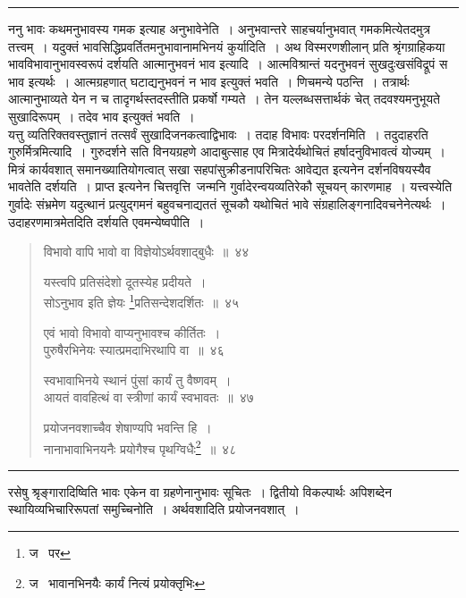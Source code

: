 \documentclass[11pt, openany]{book}
\begin{document}
\hrule

\vspace{2mm}
ननु भावः कथमनुभावस्य गमक इत्याह अनुभावेनेति~। अनुभवान्तरे साहचर्यानुभवात् गमकमित्येतदमुत्र तत्त्वम्~। यदुक्तं भावसिद्धिप्रवर्तितमनुभावानामभिनयं कुर्यादिति~। अथ विस्मरणशीलान् प्रति श्रृंगग्राहिकया भावविभावानुभावस्वरूपं दर्शयति आत्मानुभवनं भाव इत्यादि~। आत्मविश्रान्तं यदनुभवनं सुखदुःखसंविद्रूपं स भाव इत्यर्थः~। आत्मग्रहणात् घटाद्यनुभवनं न भाव इत्युक्तं भवति~। णिचमन्ये पठन्ति~। तत्रार्थः आत्मानुभाव्यते येन न च तादृगर्थस्तदस्तीति प्रकर्षो गम्यते~। तेन यल्लब्धसत्तार्थकं चेत् तदवश्यमनुभूयते सुखादिरूपम्~। तदेव भाव इत्युक्तं भवति~।\\

यत्तु व्यतिरिक्तवस्तुज्ञानं तत्सर्वं सुखादिजनकत्वाद्विभावः~। तदाह विभावः परदर्शनमिति~। तदुदाहरति गुरुर्मित्रमित्यादि~। गुरुदर्शने सति विनयग्रहणे आदाबुत्साह एव मित्रादेर्यथोचितं हर्षादनुविभावत्वं योज्यम्~। मित्रं कार्यवशात् समानख्यातियोगत्वात् सखा सहपांसुक्रीडनापरिचितः आवेद्यत इत्यनेन दर्शनविषयस्यैव भावतेति दर्शयति~। प्राप्त इत्यनेन चित्तवृत्ति\textendash\ जन्मनि गुर्वादेरन्वयव्यतिरेकौ सूचयन् कारणमाह~। यत्त्वस्येति गुर्वादेः संभ्रमेण यदुत्थानं प्रत्युद्गमनं बहुवचनाद्यततं सूचकौ यथोचितं भावे संग्रहालिङ्गनादिवचनेनेत्यर्थः~। उदाहरणमात्रमेतदिति दर्शयति एवमन्येष्वपीति~।


\newpage
\lfoot{}

\begin{quote}
{\na विभावो वापि भावो वा विज्ञेयोऽर्थवशाद्बुधैः~॥~४४

यस्त्वपि प्रतिसंदेशो दूतस्येह प्रदीयते~।\\
सोऽनुभाव इति ज्ञेयः \renewcommand{\thefootnote}{1}\footnote{ज \textendash\  पर}प्रतिसन्देशदर्शितः~॥~४५

एवं भावो विभावो वाप्यनुभावश्च कीर्तितः~।\\
पुरुषैरभिनेयः स्यात्प्रमदाभिरथापि वा~॥~४६

स्वभावाभिनये स्थानं पुंसां कार्यं तु वैष्णवम्~।\\
आयतं वावहित्थं वा स्त्रीणां कार्यं स्वभावतः~॥~४७

प्रयोजनवशाच्चैव शेषाण्यपि भवन्ति हि~।\\
नानाभावाभिनयनैः प्रयोगैश्च पृथग्विधैः\renewcommand{\thefootnote}{2}\footnote{ज \textendash\  भावानभिनयैः कार्यं नित्यं प्रयोक्तृभिः}~॥~४८}
\end{quote}

\hrule

\vspace{2mm}
\noindent
रसेषु श्रृङ्गारादिष्विति भावः एकेन वा ग्रहणेनानुभावः सूचितः~। द्वितीयो विकल्पार्थः अपिशब्देन स्थायिव्यभिचारिरूपतां समुच्चिनोति~। अर्थवशादिति प्रयोजनवशात्~।\\
\end{document}
